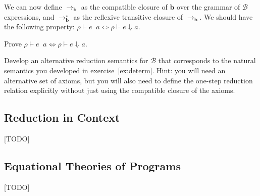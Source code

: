\documentclass[11pt]{article}
\newcommand\menv{\rho}
\newcommand\mans{a}
\newcommand\mexp{e}
\newcommand\beval[3]{{#1} \vdash {#2} \Downarrow {#3}}
\newcommand\breducename{\mathbf{b}}
\newcommand\bstepname{\rightarrow_{\breducename}}
\newcommand\bmultistepname{\rightarrow^\star_{\breducename}}
\newcommand\Barith{\mathcal{B}}
\begin{document}
We can now define $\bstepname$ as the compatible closure of
$\breducename$ over the grammar of $\Barith$ expressions, and
$\bmultistepname$ as the reflexive transitive closure of $\bstepname$.
We should have the following property:
$\menv\vdash\mexp\mathop{\bmultistepname}\mans \iff \beval\menv\mexp\mans$.

\begin{exercise}
Prove $\menv\vdash\mexp\mathop{\bmultistepname}\mans \iff \beval\menv\mexp\mans$.
\end{exercise}

\begin{exercise}
Develop an alternative reduction semantics for $\Barith$ that
corresponds to the natural semantics you developed in
exercise~\ref{ex:determ}.  Hint: you will need an alternative set of
axioms, but you will also need to define the one-step reduction
relation explicitly without just using the compatible closure of the axioms.
\end{exercise}

\subsection{Reduction in Context}

[TODO]

\subsection{Equational Theories of Programs}

[TODO]

\end{document}
